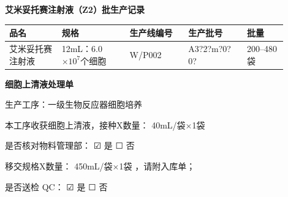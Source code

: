 \documentclass[UTF8,10pt,a4paper,fontset=fandol]{ctexart}
\newcommand{\fieldvalue}[1]{#1}
\newcommand{\handwritten}[1]{#1}
\newcommand{\checkboxfield}[1]{\ifstrequal{#1}{checked}{☑}{\ifstrequal{#1}{unclear}{?}{☐}}}
\begin{document}
\begin{center}
\textbf{艾米妥托赛注射液（Z2）批生产记录}
\end{center}

\begin{center}
\begin{tabular}{|p{0.17\linewidth}|p{0.22\linewidth}|p{0.19\linewidth}|p{0.19\linewidth}|p{0.13\linewidth}|}
\hline
品名 & 规格 & 生产线编号 & 生产批号 & 批量\\
\hline
\fieldvalue{艾米妥托赛注射液}
&
\fieldvalue{12mL：6.0$\times 10^{7}$个细胞}
&
\fieldvalue{\handwritten{W/P002}}
&
\fieldvalue{\handwritten{A3?2?m?0?0?}}
&
\fieldvalue{200--480袋}
\\
\hline
\end{tabular}
\end{center}

\begin{center}
\textbf{细胞上清液处理单}
\end{center}

生产工序：一级生物反应器细胞培养

本工序收获细胞上清液，接种X数量：
\fieldvalue{\handwritten{40mL/袋$\times$1袋}}

\medskip

是否核对物料管理部：
\fieldvalue{\handwritten{\checkboxfield{checked}}} 是
%
\fieldvalue{\checkboxfield{unchecked}} 否

\medskip

移交规格X数量：
\fieldvalue{\handwritten{450mL/袋$\times$1袋}}
，请附入库单；

\medskip

是否送检 QC：
\fieldvalue{\handwritten{\checkboxfield{checked}}} 是
%
\fieldvalue{\checkboxfield{unchecked}} 否
\end{document}
